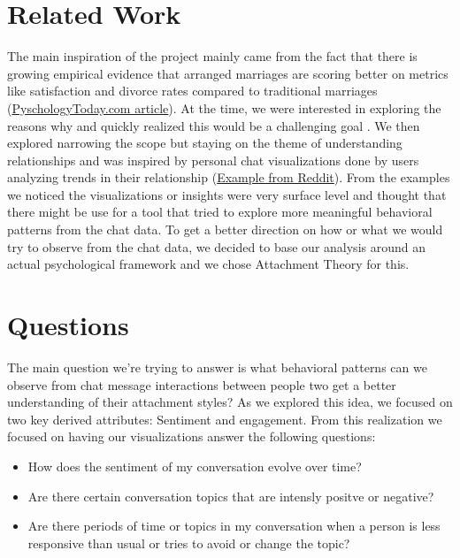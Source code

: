 \documentclass{article}\usepackage{graphicx}
\begin{document}
\section*{Related Work}
The main inspiration of the project mainly came from the fact that there is growing empirical evidence that arranged marriages are scoring better on metrics like satisfaction and divorce rates compared to traditional marriages (\href{https://www.psychologytoday.com/us/blog/the-science-behind-behavior/201511/why-are-so-many-indian-arranged-marriages-successful}{PyschologyToday.com article}). At the time, we were interested in exploring the reasons why and quickly realized this would be a challenging goal . We then explored narrowing the scope but staying on the theme of understanding relationships and was inspired by personal chat visualizations done by users analyzing trends in their relationship (\href{https://github.com/bibascoumass/chat-vibe-check}{Example from Reddit}). From the examples we noticed the visualizations or insights were very surface level and thought that there might be use for a tool that tried to explore more meaningful behavioral patterns from the chat data. To get a better direction on how or what we would try to observe from the chat data, we decided to base our analysis around an actual psychological framework and we chose Attachment Theory for this.  

\section*{Questions}
The main question we're trying to answer is what behavioral patterns can we observe from chat message interactions between people two get a better understanding of their attachment styles? As we explored this idea, we focused on two key derived attributes: Sentiment and engagement. From this realization we focused on having our visualizations answer the following questions:
\begin{itemize}
    \item How does the sentiment of my conversation evolve over time?
    \item Are there certain conversation topics that are intensly positve or negative? 
    \item Are there periods of time or topics in my conversation when a person is less responsive than usual or tries to avoid or change the topic? 
\end{itemize}
\end{document}
